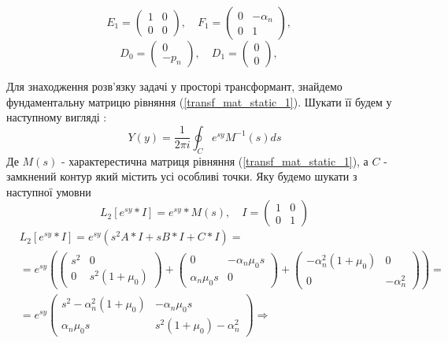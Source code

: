 \begin{equation*}
    E_1 = \begin{pmatrix}
        1 & 0 \\
        0 & 0
    \end{pmatrix}, \quad
    F_1 = \begin{pmatrix}
        0 & -\alpha_n \\
        0 & 1
    \end{pmatrix}, \quad
\end{equation*}
\begin{equation*}
    D_0 = \begin{pmatrix}
        0 \\
        -p_n
    \end{pmatrix}, \quad
    D_1 = \begin{pmatrix}
        0 \\
        0
    \end{pmatrix}, \quad
\end{equation*}

Для знаходження розв'язку задачі у просторі трансформант, знайдемо фундаментальну матрицю рівняння (\ref{transf_mat_static_1}).
Шукати її будем у наступному вигляді \cite{gantmaher}:
\begin{equation}
    Y(y) = \frac{1}{2\pi i} \oint_C e^{sy} M^{-1}(s)ds
\end{equation}
Де $M(s)$ - характерестична матриця рівняння (\ref{transf_mat_static_1}), а $C$ - замкнений контур який містить усі особливі точки. Яку будемо шукати з наступної умовни
\begin{equation}
    L_2\left[ e^{sy}*I \right] = e^{sy} * M(s), \quad I = \begin{pmatrix} 1 & 0 \\ 0 & 1 \end{pmatrix}
\end{equation}
\begin{align*}
    &L_2\left[ e^{sy}*I \right] = e^{sy} \left( s^2A * I + s B*I + C*I \right) = \\
    &=e^{sy} \left( \begin{pmatrix}
        s^2 & 0 \\
        0 & s^2 (1 + \mu_0)
    \end{pmatrix} + \begin{pmatrix}
        0 & -\alpha_n \mu_0 s\\
        \alpha_n \mu_0 s & 0
    \end{pmatrix} + \begin{pmatrix}
        -\alpha_n^2(1 + \mu_0) & 0 \\
        0 & -\alpha_n^2
    \end{pmatrix} \right) =  \\
    &=e^{sy} \begin{pmatrix}
        s^2 -\alpha_n^2(1 + \mu_0) & -\alpha_n \mu_0 s \\
        \alpha_n \mu_0 s & s^2 (1 + \mu_0) -\alpha_n^2
     \end{pmatrix} \Rightarrow
\end{align*}

